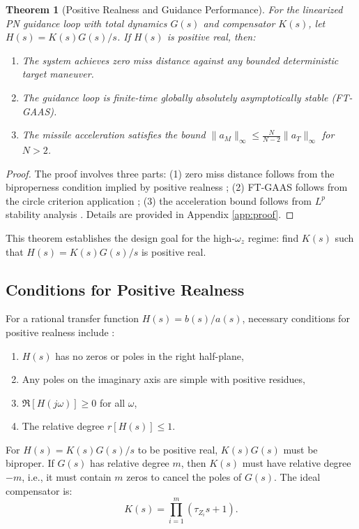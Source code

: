 \documentclass[11pt,a4paper]{article}
\newtheorem{theorem}{Theorem}
\begin{document}
\begin{theorem}[Positive Realness and Guidance Performance]
For the linearized PN guidance loop with total dynamics $G(s)$ and compensator $K(s)$, let $H(s) = K(s)G(s)/s$. If $H(s)$ is positive real, then:
\begin{enumerate}
    \item The system achieves zero miss distance against any bounded deterministic target maneuver.
    \item The guidance loop is finite-time globally absolutely asymptotically stable (FT-GAAS).
    \item The missile acceleration satisfies the bound $\|a_M\|_\infty \leq \frac{N}{N-2} \|a_T\|_\infty$ for $N>2$.
\end{enumerate}
\end{theorem}
\begin{proof}
The proof involves three parts: (1) zero miss distance follows from the biproperness condition implied by positive realness \cite{Gurfil1998_08}; (2) FT-GAAS follows from the circle criterion application \cite{Gurfil1998_11}; (3) the acceleration bound follows from $L^p$ stability analysis \cite{Gurfil2003}. Details are provided in Appendix \ref{app:proof}.
\end{proof}

This theorem establishes the design goal for the high-$\omega_z$ regime: find $K(s)$ such that $H(s)=K(s)G(s)/s$ is positive real.

\subsection{Conditions for Positive Realness}
For a rational transfer function $H(s) = b(s)/a(s)$, necessary conditions for positive realness include \cite{Gurfil1998_08}:
\begin{enumerate}
    \item $H(s)$ has no zeros or poles in the right half-plane,
    \item Any poles on the imaginary axis are simple with positive residues,
    \item $\Re[H(j\omega)] \geq 0$ for all $\omega$,
    \item The relative degree $r[H(s)] \leq 1$.
\end{enumerate}

For $H(s) = K(s)G(s)/s$ to be positive real, $K(s)G(s)$ must be biproper. If $G(s)$ has relative degree $m$, then $K(s)$ must have relative degree $-m$, i.e., it must contain $m$ zeros to cancel the poles of $G(s)$. The ideal compensator is:
\begin{equation}
K(s) = \prod_{i=1}^{m} (\tau_{Z_i} s + 1).
\label{eq:ideal_compensator}
\end{equation}
\end{document}

